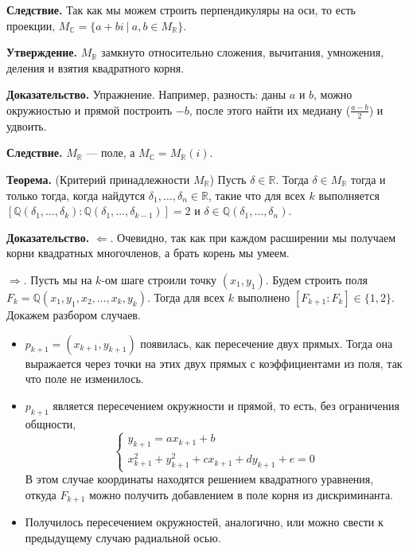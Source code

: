 \textbf{Следствие.} Так как мы можем строить перпендикуляры на оси, то есть проекции, $M_\mathbb C = \{a + bi~|~a, b \in M_\mathbb R\}$.

\textbf{Утверждение.} $M_\mathbb R$ замкнуто относительно сложения, вычитания, умножения, деления и взятия квадратного корня.

\textbf{Доказательство.} Упражнение.
Например, разность: даны $a$ и $b$, можно окружностью и прямой построить $-b$, после этого найти их медиану ($\frac{a - b}{2}$) и удвоить.

\QED

\textbf{Следствие.} $M_\mathbb R$ --- поле, а $M_\mathbb C = M_\mathbb R(i)$.

\textbf{Теорема.} (Критерий принадлежности $M_\mathbb R$) Пусть $\delta \in \mathbb R$.
Тогда $\delta \in M_\mathbb R$ тогда и только тогда, когда найдутся $\delta_1, \dots, \delta_n \in \mathbb R$, такие что для всех $k$ выполняется $[\mathbb Q(\delta_1, \dots, \delta_k) : \mathbb Q(\delta_1, \dots, \delta_{k-1})] = 2$ и $\delta \in \mathbb Q(\delta_1, \dots, \delta_n)$.

\textbf{Доказательство.} $\Leftarrow$. Очевидно, так как при каждом расширении мы получаем корни квадратных многочленов, а брать корень мы умеем.

$\Rightarrow$. Пусть мы на $k$-ом шаге строили точку $(x_1, y_1)$.
Будем строить поля $F_k = \mathbb Q(x_1, y_1, x_2, \dots, x_k, y_k)$.
Тогда для всех $k$ выполнено $[F_{k+1} : F_k] \in \{1, 2\}$.
Докажем разбором случаев.
\begin{itemize}
    \item $p_{k+1} = (x_{k+1}, y_{k+1})$ появилась, как пересечение двух прямых.
        Тогда она выражается через точки на этих двух прямых с коэффициентами из поля, так что поле не изменилось.
    \item $p_{k+1}$ является пересечением окружности и прямой, то есть, без ограничения общности,
        \[
            \begin{cases}
                y_{k+1} = ax_{k+1} + b \\
                x_{k+1}^2 + y_{k+1}^2 + cx_{k+1} + dy_{k+1} + e = 0
            \end{cases}
        \]
        В этом случае координаты находятся решением квадратного уравнения, откуда $F_{k+1}$ можно получить добавлением в поле корня из дискриминанта.
    \item Получилось пересечением окружностей, аналогично, или можно свести к предыдущему случаю радиальной осью.
\end{itemize}

